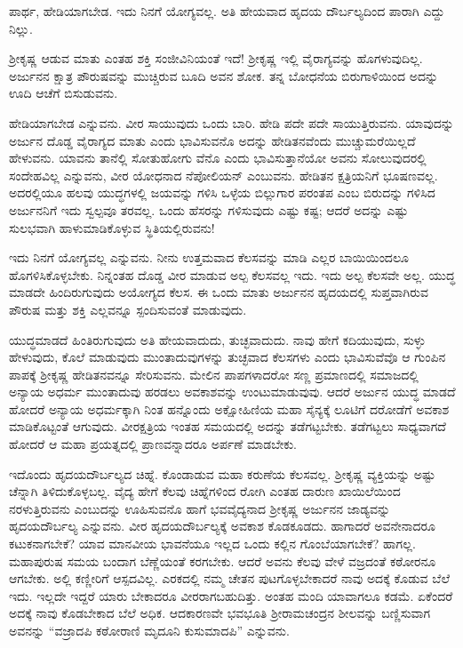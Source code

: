 \begin{artha}
ಪಾರ್ಥ, ಹೇಡಿಯಾಗಬೇಡ. ಇದು ನಿನಗೆ ಯೋಗ್ಯವಲ್ಲ. ಅತಿ ಹೇಯವಾದ ಹೃದಯ ದೌರ್ಬಲ್ಯದಿಂದ ಪಾರಾಗಿ ಎದ್ದು ನಿಲ್ಲು.
\end{artha}

ಶ‍್ರೀಕೃಷ್ಣ ಆಡುವ ಮಾತು ಎಂತಹ ಶಕ್ತಿ ಸಂಜೀವಿನಿಯಂತೆ ಇದೆ! ಶ‍್ರೀಕೃಷ್ಣ ಇಲ್ಲಿ ವೈರಾಗ್ಯವನ್ನು ಹೊಗಳುವುದಿಲ್ಲ. ಅರ್ಜುನನ ಕ್ಷಾತ್ರ ಪೌರುಷವನ್ನು ಮುಚ್ಚಿರುವ ಬೂದಿ ಅವನ ಶೋಕ. ತನ್ನ ಬೋಧನೆಯ ಬಿರುಗಾಳಿಯಿಂದ ಅದನ್ನು ಊದಿ ಆಚೆಗೆ ಬಿಸುಡುವನು.

ಹೇಡಿಯಾಗಬೇಡ ಎನ್ನುವನು. ವೀರ ಸಾಯುವುದು ಒಂದು ಬಾರಿ. ಹೇಡಿ ಪದೇ ಪದೇ ಸಾಯುತ್ತಿರುವನು. ಯಾವುದನ್ನು ಅರ್ಜುನ ದೊಡ್ಡ ವೈರಾಗ್ಯದ ಮಾತು ಎಂದು ಭಾವಿಸುವನೊ ಅದನ್ನು ಹೇಡಿತನವೆಂದು ಮುಚ್ಚುಮರೆಯಿಲ್ಲದೆ ಹೇಳುವನು. ಯಾವನು ತಾನೆಲ್ಲಿ ಸೋತುಹೋಗು ವೆನೊ ಎಂದು ಭಾವಿಸುತ್ತಾನೆಯೋ ಅವನು ಸೋಲುವುದರಲ್ಲಿ ಸಂದೇಹವಿಲ್ಲ ಎನ್ನುವನು, ವೀರ ಯೋಧನಾದ ನೆಪೋಲಿಯನ್ ಎಂಬುವನು. ಹೇಡಿತನ ಕ್ಷತ್ರಿಯನಿಗೆ ಭೂಷಣವಲ್ಲ. ಅದರಲ್ಲಿಯೂ ಹಲವು ಯುದ್ಧಗಳಲ್ಲಿ ಜಯವನ್ನು ಗಳಿಸಿ ಒಳ್ಳೆಯ ಬಿಲ್ಲುಗಾರ ಪರಂತಪ ಎಂಬ ಬಿರುದನ್ನು ಗಳಿಸಿದ ಅರ್ಜುನನಿಗೆ ಇದು ಸ್ವಲ್ಪವೂ ತರವಲ್ಲ. ಒಂದು ಹೆಸರನ್ನು ಗಳಿಸುವುದು ಎಷ್ಟು ಕಷ್ಟ; ಆದರೆ ಅದನ್ನು ಎಷ್ಟು ಸುಲಭವಾಗಿ ಹಾಳುಮಾಡಿಕೊಳ್ಳುವ ಸ್ಥಿತಿಯಲ್ಲಿರುವನು!

ಇದು ನಿನಗೆ ಯೋಗ್ಯವಲ್ಲ ಎನ್ನುವನು. ನೀನು ಉತ್ತಮವಾದ ಕೆಲಸವನ್ನು ಮಾಡಿ ಎಲ್ಲರ ಬಾಯಿಯಿಂದಲೂ ಹೊಗಳಿಸಿಕೊಳ್ಳಬೇಕು. ನಿನ್ನಂತಹ ದೊಡ್ಡ ವೀರ ಮಾಡುವ ಅಲ್ಪ ಕೆಲಸವಲ್ಲ ಇದು. ಇದು ಅಲ್ಪ ಕೆಲಸವೇ ಅಲ್ಲ. ಯುದ್ಧ ಮಾಡದೇ ಹಿಂದಿರುಗುವುದು ಅಯೋಗ್ಯದ ಕೆಲಸ. ಈ ಒಂದು ಮಾತು ಅರ್ಜುನನ ಹೃದಯದಲ್ಲಿ ಸುಪ್ತವಾಗಿರುವ ಪೌರುಷ ಮತ್ತು ಶಕ್ತಿ ಎಲ್ಲವನ್ನೂ ಸ್ಪಂದಿಸುವಂತೆ ಮಾಡುವುದು.

ಯುದ್ಧಮಾಡದೆ ಹಿಂತಿರುಗುವುದು ಅತಿ ಹೇಯವಾದುದು, ತುಚ್ಛವಾದುದು. ನಾವು ಹೇಗೆ ಕದಿಯುವುದು, ಸುಳ್ಳು ಹೇಳುವುದು, ಕೊಲೆ ಮಾಡುವುದು ಮುಂತಾದುವುಗಳನ್ನು ತುಚ್ಛವಾದ ಕೆಲಸಗಳು ಎಂದು ಭಾವಿಸುವೆವೊ ಆ ಗುಂಪಿನ ಪಾಪಕ್ಕೆ ಶ‍್ರೀಕೃಷ್ಣ ಹೇಡಿತನವನ್ನೂ ಸೇರಿಸುವನು. ಮೇಲಿನ ಪಾಪಗಳಾದರೋ ಸಣ್ಣ ಪ್ರಮಾಣದಲ್ಲಿ ಸಮಾಜದಲ್ಲಿ ಅನ್ಯಾಯ ಅಧರ್ಮ ಮುಂತಾದುವು ಹರಡಲು ಅವಕಾಶವನ್ನು ಉಂಟುಮಾಡುವುವು. ಆದರೆ ಅರ್ಜುನ ಯುದ್ಧ ಮಾಡದೆ ಹೋದರೆ ಅನ್ಯಾಯ ಅಧರ್ಮಕ್ಕಾಗಿ ನಿಂತ ಹನ್ನೊಂದು ಅಕ್ಷೋಹಿಣಿಯ ಮಹಾ ಸೈನ್ಯಕ್ಕೆ ಲೂಟಿಗೆ ದರೋಡೆಗೆ ಅವಕಾಶ ಮಾಡಿಕೊಟ್ಟಂತೆ ಆಗುವುದು. ವೀರಕ್ಷತ್ರಿಯ ಇಂತಹ ಸಮಯದಲ್ಲಿ ಅದನ್ನು ತಡೆಗಟ್ಟಬೇಕು. ತಡೆಗಟ್ಟಲು ಸಾಧ್ಯವಾಗದೆ ಹೋದರೆ ಆ ಮಹಾ ಪ್ರಯತ್ನದಲ್ಲಿ ಪ್ರಾಣವನ್ನಾದರೂ ಅರ್ಪಣೆ ಮಾಡಬೇಕು.

ಇದೊಂದು ಹೃದಯದೌರ್ಬಲ್ಯದ ಚಿಹ್ನೆ. ಕೊಂಡಾಡುವ ಮಹಾ ಕರುಣೆಯ ಕೆಲಸವಲ್ಲ. ಶ‍್ರೀಕೃಷ್ಣ ವ್ಯಕ್ತಿಯನ್ನು ಅಷ್ಟು ಚೆನ್ನಾಗಿ ತಿಳಿದುಕೊಳ್ಳಬಲ್ಲ. ವೈದ್ಯ ಹೇಗೆ ಕೆಲವು ಚಿಹ್ನೆಗಳಿಂದ ರೋಗಿ ಎಂತಹ ದಾರುಣ ಖಾಯಿಲೆಯಿಂದ ನರಳುತ್ತಿರುವನು ಎಂಬುದನ್ನು ಊಹಿಸುವನೊ ಹಾಗೆ ಭವವೈದ್ಯನಾದ ಶ‍್ರೀಕೃಷ್ಣ ಅರ್ಜುನನ ಜಾಡ್ಯವನ್ನು ಹೃದಯದೌರ್ಬಲ್ಯ ಎನ್ನುವನು. ವೀರ ಹೃದಯದೌರ್ಬಲ್ಯಕ್ಕೆ ಅವಕಾಶ ಕೊಡಕೂಡದು. ಹಾಗಾದರೆ ಅವನೇನಾದರೂ ಕಟುಕನಾಗ\-ಬೇಕೆ? ಯಾವ ಮಾನವೀಯ ಭಾವನೆಯೂ ಇಲ್ಲದ ಒಂದು ಕಲ್ಲಿನ ಗೊಂಬೆಯಾಗಬೇಕೆ? ಹಾಗಲ್ಲ. ಮಹಾಪುರುಷ ಸಮಯ ಬಂದಾಗ ಬೆಣ್ಣೆಯಂತೆ ಕರಗಬೇಕು. ಆದರೆ ಅವನು ಕೆಲವು ವೇಳೆ ವಜ್ರದಂತೆ ಕಠೋರನೂ ಆಗಬೇಕು. ಅಲ್ಲಿ ಕಣ್ಣೀರಿಗೆ ಆಸ್ಪದವಿಲ್ಲ. ಎರಕದಲ್ಲಿ ನಮ್ಮ ಚೇತನ ಪುಟಗೊಳ್ಳಬೇಕಾದರೆ ನಾವು ಅದಕ್ಕೆ ಕೊಡುವ ಬೆಲೆ ಇದು. ಇಲ್ಲದೇ ಇದ್ದರೆ ಯಾರು ಬೇಕಾದರೂ ವೀರರಾಗಬಹುದಿತ್ತು. ಅಂತಹ ಮಂದಿ ಯಾವಾಗಲೂ ಕಡಮೆ. ಏಕೆಂದರೆ ಅದಕ್ಕೆ ನಾವು ಕೊಡಬೇಕಾದ ಬೆಲೆ ಅಧಿಕ. ಆದಕಾರಣವೇ ಭವಭೂತಿ ಶ‍್ರೀರಾಮಚಂದ್ರನ ಶೀಲವನ್ನು ಬಣ್ಣಿಸುವಾಗ ಅವನನ್ನು “ವಜ್ರಾದಪಿ ಕಠೋರಾಣಿ ಮೃದೂನಿ ಕುಸುಮಾದಪಿ” ಎನ್ನುವನು.

